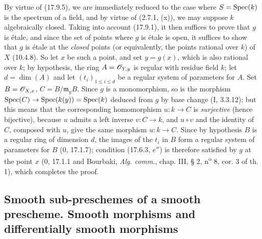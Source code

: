 By virtue of (17.9.5), we are immediately reduced to the case where $S=\operatorname{Spec}(k)$ is the spectrum of a field, and by virtue of (2.7.1, (x)), we may suppose $k$ algebraically closed. Taking into account (17.9.1), it then suffices to prove that $g$ is étale, and since the set of points where $g$ is étale is open, it suffices to show that $g$ is étale at the \emph{closed} points (or equivalently, the points rational over $k$) of $X$ (10.4.8). So let $x$ be such a point, and set $y=g(x)$, which is also rational over $k$; by hypothesis, the ring $A=\mathscr{O}_{Y,y}$ is regular with residue field $k$; let $d=\dim(A)$ and let $(t_i)_{1\leq i\leq d}$ be a regular system of parameters for $A$. Set $B=\mathscr{O}_{X,x}$, $C=B/\mathfrak m_yB$. Since $g$ is a monomorphism, so is the morphism $\operatorname{Spec}(C)\to\operatorname{Spec}(k(y))=\operatorname{Spec}(k)$ deduced from $g$ by base change (I, 3.3.12); but this means that the corresponding homomorphism $u:k\to C$ is \emph{surjective} (hence bijective), because $u$ admits a left inverse $v:C\to k$, and $u\circ v$ and the identity of $C$, composed with $u$, give the same morphism $u:k\to C$. Since by hypothesis $B$ is a regular ring of dimension $d$, the images of the $t_i$ in $B$ form a regular system of parameters for $B$ (0, 17.1.7); condition (17.6.3, $e''$) is therefore satisfied by $g$ at the point $x$ (0, 17.1.1 and Bourbaki, \emph{Alg. comm.}, chap. III, § 2, n\textsuperscript{o} 8, cor. 3 of th. 1), which completes the proof.

\subsection{Smooth sub-preschemes of a smooth prescheme. Smooth morphisms and differentially smooth morphisms}

